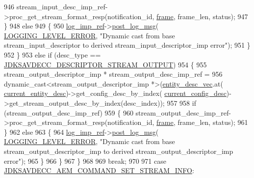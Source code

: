 \begin{DoxyCode}
{{946                 stream\_input\_desc\_imp\_ref->proc\_get\_stream\_format\_resp(notification\_id, 
      \hyperlink{gst__avb__playbin_8c_ac8e710e0b5e994c0545d75d69868c6f0}{frame}, frame\_len, status);
947             \}
948             \textcolor{keywordflow}{else}
949             \{
950                 \hyperlink{namespaceavdecc__lib_acbe3e2a96ae6524943ca532c87a28529}{log\_imp\_ref}->\hyperlink{classavdecc__lib_1_1log_a68139a6297697e4ccebf36ccfd02e44a}{post\_log\_msg}(
      \hyperlink{namespaceavdecc__lib_a501055c431e6872ef46f252ad13f85cdaf2c4481208273451a6f5c7bb9770ec8a}{LOGGING\_LEVEL\_ERROR}, \textcolor{stringliteral}{"Dynamic cast from base stream\_input\_descriptor to derived
       stream\_input\_descriptor\_imp error"});
951             \}
952         \}
953         \textcolor{keywordflow}{else} \textcolor{keywordflow}{if} (desc\_type == \hyperlink{group__descriptor_gab458eb4963f42bfa5591d5dd604bedce}{JDKSAVDECC\_DESCRIPTOR\_STREAM\_OUTPUT})
954         \{
955             stream\_output\_descriptor\_imp * stream\_output\_desc\_imp\_ref =
956                 \textcolor{keyword}{dynamic\_cast<}stream\_output\_descriptor\_imp *\textcolor{keyword}{>}(\hyperlink{classavdecc__lib_1_1end__station__imp_a72edab41bc56e3c1757944a7df188a3d}{entity\_desc\_vec}.at(
      \hyperlink{classavdecc__lib_1_1end__station__imp_afd78c89df26ba7641e1adb764c0e827d}{current\_entity\_desc})->get\_config\_desc\_by\_index(
      \hyperlink{classavdecc__lib_1_1end__station__imp_a60b1af40d35e8a86b0082c54ab6cb6a8}{current\_config\_desc})->get\_stream\_output\_desc\_by\_index(desc\_index));
957 
958             \textcolor{keywordflow}{if} (stream\_output\_desc\_imp\_ref)
959             \{
960                 stream\_output\_desc\_imp\_ref->proc\_get\_stream\_format\_resp(notification\_id, 
      \hyperlink{gst__avb__playbin_8c_ac8e710e0b5e994c0545d75d69868c6f0}{frame}, frame\_len, status);
961             \}
962             \textcolor{keywordflow}{else}
963             \{
964                 \hyperlink{namespaceavdecc__lib_acbe3e2a96ae6524943ca532c87a28529}{log\_imp\_ref}->\hyperlink{classavdecc__lib_1_1log_a68139a6297697e4ccebf36ccfd02e44a}{post\_log\_msg}(
      \hyperlink{namespaceavdecc__lib_a501055c431e6872ef46f252ad13f85cdaf2c4481208273451a6f5c7bb9770ec8a}{LOGGING\_LEVEL\_ERROR}, \textcolor{stringliteral}{"Dynamic cast from base stream\_output\_descriptor\_imp to derived
       stream\_output\_descriptor\_imp error"});
965             \}
966         \}
967     \}
968 
969     \textcolor{keywordflow}{break};
970 
971     \textcolor{keywordflow}{case} \hyperlink{group__command_gab717d775edf0abc460068c111cd0ee3b}{JDKSAVDECC\_AEM\_COMMAND\_SET\_STREAM\_INFO}:
}}
\end{DoxyCode}

